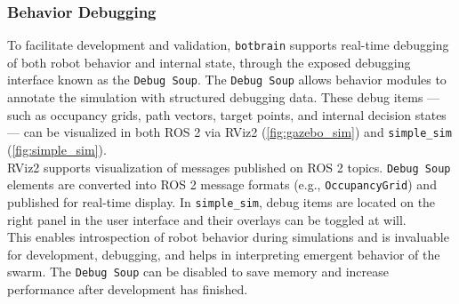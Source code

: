 \subsubsection{Behavior Debugging}
To facilitate development and validation, \texttt{botbrain} supports real-time debugging of both robot behavior and internal state, through the exposed debugging interface known as the \texttt{Debug Soup}. The \texttt{Debug Soup} allows behavior modules to annotate the simulation with structured debugging data. These debug items --- such as occupancy grids, path vectors, target points, and internal decision states --- can be visualized in both ROS 2 via RViz2 (\cref{fig:gazebo_sim}) and \texttt{simple\_sim} (\cref{fig:simple_sim}). \\

RViz2 supports visualization of messages published on ROS 2 topics. \texttt{Debug Soup} elements are converted into ROS 2 message formats (e.g., \texttt{OccupancyGrid}) and published for real-time display. In \texttt{simple\_sim}, debug items are located on the right panel in the user interface and their overlays can be toggled at will. \\

This enables introspection of robot behavior during simulations and is invaluable for development, debugging, and helps in interpreting emergent behavior of the swarm. The \texttt{Debug Soup} can be disabled to save memory and increase performance after development has finished.
